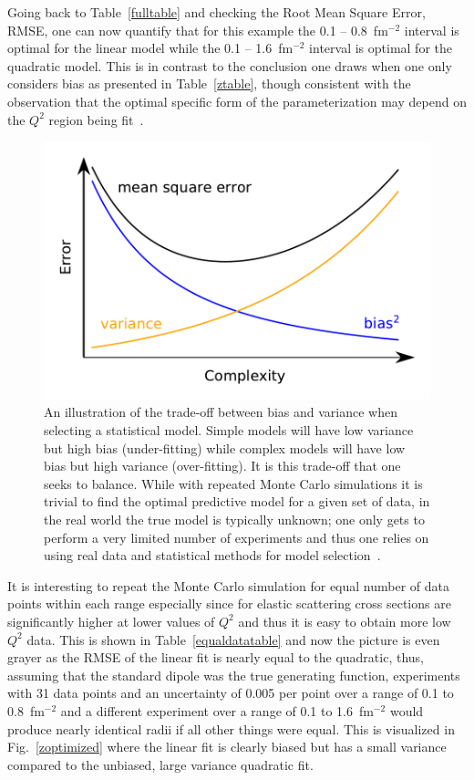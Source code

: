 \documentclass[10pt,aps,prc,twocolumn]{revtex4-1}
\begin{document}
Going back to Table~\ref{fulltable} and checking the Root Mean Square Error, RMSE, one can now quantify 
that for this example the 0.1 -- 0.8~fm$^{-2}$ interval is optimal for the linear model while the 0.1 -- 1.6~fm$^{-2}$ 
interval is optimal for the quadratic model. 
This is in contrast to the conclusion one draws when one only considers bias as presented in Table~\ref{ztable},
though consistent with the observation that the optimal specific form of the parameterization 
may depend on the $Q^2$ region being fit~\cite{Alberico:2008sz}.
\begin{figure}
\includegraphics[width=\columnwidth]{Figure/biasvariance-clean.pdf}
\caption{An illustration of the trade-off between bias and variance when selecting a statistical model.   Simple models
will have low variance but high bias (under-fitting) while complex models will have low bias but high variance (over-fitting).   
It is this trade-off that one seeks to balance.   While with repeated  Monte Carlo simulations it is trivial to find the optimal
predictive model for a given set of data, in the real world the true model is typically unknown; one only gets to perform
a very limited number of experiments and thus one relies on using real data and statistical methods for 
model selection~\cite{Hastie:2009}.}
\label{biasvariance}
\end{figure}

It is interesting to repeat the Monte Carlo simulation for equal number of data points within each range
especially since for elastic scattering cross sections are significantly higher at lower values of $Q^2$
and thus it is easy to obtain more low $Q^2$ data.
This is shown in Table~\ref{equaldatatable} and now the picture is even grayer as the RMSE of the linear 
fit is nearly equal to the quadratic, thus, assuming that the standard dipole was the true generating function,  experiments
with 31 data points and an uncertainty of 0.005 per point over a range of 0.1 to 0.8~fm$^{-2}$ and a different experiment
over a range of 0.1 to 1.6~fm$^{-2}$ would produce nearly identical radii if all other things were equal.
This is visualized in Fig.~\ref{zoptimized} where the linear fit is clearly biased but has a small variance compared to
the unbiased, large variance quadratic fit.
\end{document}
